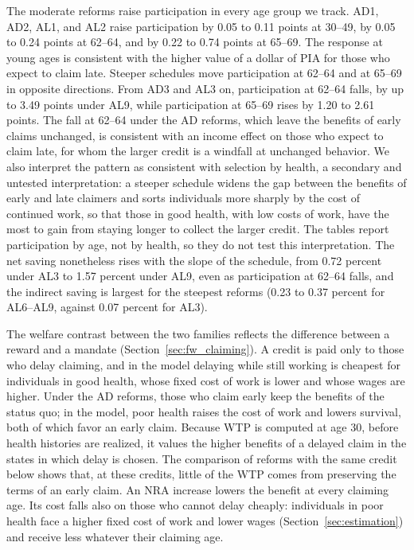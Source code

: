 The moderate reforms raise participation in every age group we track. AD1, AD2, AL1, and AL2 raise participation by 0.05 to 0.11 points at 30--49, by 0.05 to 0.24 points at 62--64, and by 0.22 to 0.74 points at 65--69. The response at young ages is consistent with the higher value of a dollar of PIA for those who expect to claim late. Steeper schedules move participation at 62--64 and at 65--69 in opposite directions. From AD3 and AL3 on, participation at 62--64 falls, by up to 3.49 points under AL9, while participation at 65--69 rises by 1.20 to 2.61 points. The fall at 62--64 under the AD reforms, which leave the benefits of early claims unchanged, is consistent with an income effect on those who expect to claim late, for whom the larger credit is a windfall at unchanged behavior. We also interpret the pattern as consistent with selection by health, a secondary and untested interpretation: a steeper schedule widens the gap between the benefits of early and late claimers and sorts individuals more sharply by the cost of continued work, so that those in good health, with low costs of work, have the most to gain from staying longer to collect the larger credit. The tables report participation by age, not by health, so they do not test this interpretation. The net saving nonetheless rises with the slope of the schedule, from 0.72 percent under AL3 to 1.57 percent under AL9, even as participation at 62--64 falls, and the indirect saving is largest for the steepest reforms (0.23 to 0.37 percent for AL6--AL9, against 0.07 percent for AL3).

The welfare contrast between the two families reflects the difference between a reward and a mandate (Section~\ref{sec:fw_claiming}). A credit is paid only to those who delay claiming, and in the model delaying while still working is cheapest for individuals in good health, whose fixed cost of work is lower and whose wages are higher. Under the AD reforms, those who claim early keep the benefits of the status quo; in the model, poor health raises the cost of work and lowers survival, both of which favor an early claim. Because WTP is computed at age 30, before health histories are realized, it values the higher benefits of a delayed claim in the states in which delay is chosen. The comparison of reforms with the same credit below shows that, at these credits, little of the WTP comes from preserving the terms of an early claim. An NRA increase lowers the benefit at every claiming age. Its cost falls also on those who cannot delay cheaply: individuals in poor health face a higher fixed cost of work and lower wages (Section~\ref{sec:estimation}) and receive less whatever their claiming age.

